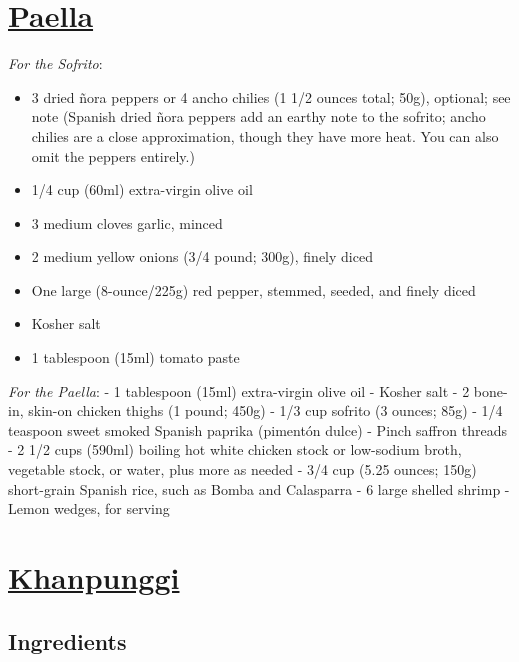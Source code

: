 \documentclass[]{article}
\providecommand{\tightlist}{%
  \setlength{\itemsep}{0pt}\setlength{\parskip}{0pt}}
\begin{document}
\hypertarget{paella}{%
\section{\texorpdfstring{\href{https://www.seriouseats.com/recipes/2019/09/stovetop-paella-mixta-for-two-with-chicken-and-shrimp.html}{Paella}}{Paella}}\label{paella}}

\emph{For the Sofrito}:

\begin{itemize}
\tightlist
\item
  3 dried ñora peppers or 4 ancho chilies (1 1/2 ounces total; 50g), optional; see note (Spanish dried ñora peppers add an earthy note to the sofrito; ancho chilies are a close approximation, though they have more heat. You can also omit the peppers entirely.)
\item
  1/4 cup (60ml) extra-virgin olive oil
\item
  3 medium cloves garlic, minced
\item
  2 medium yellow onions (3/4 pound; 300g), finely diced
\item
  One large (8-ounce/225g) red pepper, stemmed, seeded, and finely diced
\item
  Kosher salt
\item
  1 tablespoon (15ml) tomato paste
\end{itemize}

\emph{For the Paella}:
- 1 tablespoon (15ml) extra-virgin olive oil
- Kosher salt
- 2 bone-in, skin-on chicken thighs (1 pound; 450g)
- 1/3 cup sofrito (3 ounces; 85g)
- 1/4 teaspoon sweet smoked Spanish paprika (pimentón dulce)
- Pinch saffron threads
- 2 1/2 cups (590ml) boiling hot white chicken stock or low-sodium broth, vegetable stock, or water, plus more as needed
- 3/4 cup (5.25 ounces; 150g) short-grain Spanish rice, such as Bomba and Calasparra
- 6 large shelled shrimp
- Lemon wedges, for serving

\hypertarget{khanpunggi}{%
\section{\texorpdfstring{\href{https://www.maangchi.com/recipe/kkanpunggi/comment-page-3}{Khanpunggi}}{Khanpunggi}}\label{khanpunggi}}

\hypertarget{ingredients}{%
\subsection{Ingredients}\label{ingredients}}
\end{document}
